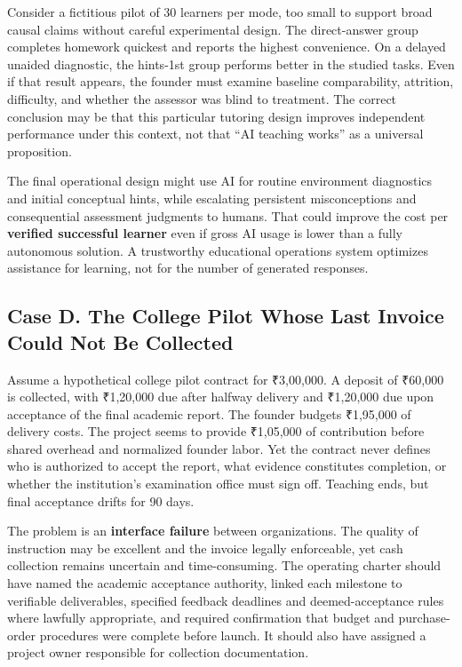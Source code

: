 Consider a fictitious pilot of 30 learners per mode, too small to support broad causal claims without careful experimental design. The direct-answer group completes homework quickest and reports the highest convenience. On a delayed unaided diagnostic, the hints-1st group performs better in the studied tasks. Even if that result appears, the founder must examine baseline comparability, attrition, difficulty, and whether the assessor was blind to treatment. The correct conclusion may be that this particular tutoring design improves independent performance under this context, not that ``AI teaching works'' as a universal proposition.

The final operational design might use AI for routine environment diagnostics and initial conceptual hints, while escalating persistent misconceptions and consequential assessment judgments to humans. That could improve the cost per \textbf{verified successful learner} even if gross AI usage is lower than a fully autonomous solution. A trustworthy educational operations system optimizes assistance for learning, not for the number of generated responses.

\subsection*{Case D. The College Pilot Whose Last Invoice Could Not Be Collected}

Assume a hypothetical college pilot contract for ₹3,00,000. A deposit of ₹60,000 is collected, with ₹1,20,000 due after halfway delivery and ₹1,20,000 due upon acceptance of the final academic report. The founder budgets ₹1,95,000 of delivery costs. The project seems to provide ₹1,05,000 of contribution before shared overhead and normalized founder labor. Yet the contract never defines who is authorized to accept the report, what evidence constitutes completion, or whether the institution's examination office must sign off. Teaching ends, but final acceptance drifts for 90 days.

The problem is an \textbf{interface failure} between organizations. The quality of instruction may be excellent and the invoice legally enforceable, yet cash collection remains uncertain and time-consuming. The operating charter should have named the academic acceptance authority, linked each milestone to verifiable deliverables, specified feedback deadlines and deemed-acceptance rules where lawfully appropriate, and required confirmation that budget and purchase-order procedures were complete before launch. It should also have assigned a project owner responsible for collection documentation.

